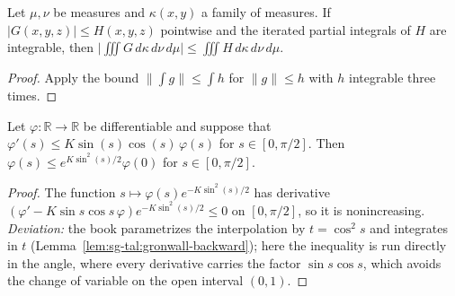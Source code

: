 \begin{lemma}
\label{lem:sg-tal:iterated-bound}
  \leanok
{}
Let $\mu,\nu$ be measures and $\kappa(x,y)$ a family of measures. If
$|G(x,y,z)|\le H(x,y,z)$ pointwise and the iterated partial integrals of $H$ are integrable, then
$\bigl|\iiint G\,d\kappa\,d\nu\,d\mu\bigr|\le\iiint H\,d\kappa\,d\nu\,d\mu$.
\end{lemma}
\begin{proof}
  \leanok
Apply the bound $\|\int g\|\le\int h$ for $\|g\|\le h$ with $h$ integrable three times.
\end{proof}

\begin{lemma}
\label{lem:sg-tal:gronwall-angle}
  \leanok
{}
Let $\varphi:\mathbb R\to\mathbb R$ be differentiable and suppose that
$\varphi'(s)\le K\sin(s)\cos(s)\,\varphi(s)$ for $s\in[0,\pi/2]$.  Then
$\varphi(s)\le e^{K\sin^2(s)/2}\varphi(0)$ for $s\in[0,\pi/2]$.
\end{lemma}
\begin{proof}
  \leanok
The function $s\mapsto\varphi(s)e^{-K\sin^2(s)/2}$ has derivative
$(\varphi'-K\sin s\cos s\,\varphi)e^{-K\sin^2(s)/2}\le0$ on $[0,\pi/2]$, so it is nonincreasing.
\emph{Deviation:} the book parametrizes the interpolation by $t=\cos^2 s$ and integrates in $t$
(Lemma~\ref{lem:sg-tal:gronwall-backward}); here the inequality is run directly in the angle, where
every derivative carries the factor $\sin s\cos s$, which avoids the change of variable on the
open interval $(0,1)$.
\end{proof}

